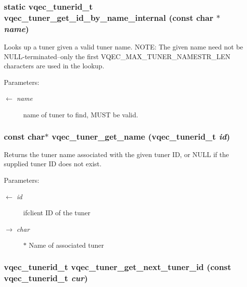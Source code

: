 \subsubsection{\setlength{\rightskip}{0pt plus 5cm}static vqec\_\-tunerid\_\-t vqec\_\-tuner\_\-get\_\-id\_\-by\_\-name\_\-internal (const char $\ast$ {\em name})\hspace{0.3cm}{\tt  [static]}}\label{vqec__tuner_8c_a73e564f4e90fe136e516953a55baed3}


Looks up a tuner given a valid tuner name. NOTE: The given name need not be NULL-terminated--only the first VQEC\_\-MAX\_\-TUNER\_\-NAMESTR\_\-LEN characters are used in the lookup.

\begin{Desc}
\item[Parameters:]
\begin{description}
\item[\mbox{$\leftarrow$} {\em name}]name of tuner to find, MUST be valid. \end{description}
\end{Desc}
\subsubsection{\setlength{\rightskip}{0pt plus 5cm}const char$\ast$ vqec\_\-tuner\_\-get\_\-name (vqec\_\-tunerid\_\-t {\em id})}\label{vqec__tuner_8c_6e512982a649b387bdff78952f07f5ce}


Returns the tuner name associated with the given tuner ID, or NULL if the supplied tuner ID does not exist.

\begin{Desc}
\item[Parameters:]
\begin{description}
\item[\mbox{$\leftarrow$} {\em id}]ifclient ID of the tuner \item[\mbox{$\rightarrow$} {\em char}]$\ast$ Name of associated tuner \end{description}
\end{Desc}
\subsubsection{\setlength{\rightskip}{0pt plus 5cm}vqec\_\-tunerid\_\-t vqec\_\-tuner\_\-get\_\-next\_\-tuner\_\-id (const vqec\_\-tunerid\_\-t {\em cur})}\label{vqec__tuner_8c_b9053f075332092eeab02c240fcd7976}


